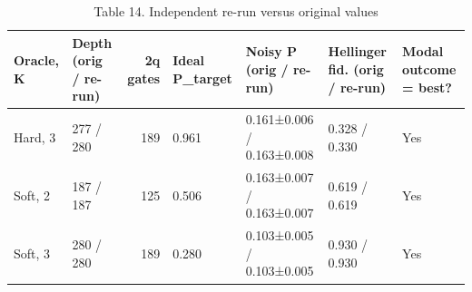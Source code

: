 \begin{table}
\caption{Table 14. Independent re-run versus original values}
\label{tab:table14}
\begin{tabular}{llrllll}
\toprule
Oracle, K & Depth (orig / re-run) & 2q gates & Ideal P\_target & Noisy P (orig / re-run) & Hellinger fid. (orig / re-run) & Modal outcome = best? \\
\midrule
Hard, 3 & 277 / 280 & 189 & 0.961 & 0.161±0.006 / 0.163±0.008 & 0.328 / 0.330 & Yes \\
Soft, 2 & 187 / 187 & 125 & 0.506 & 0.163±0.007 / 0.163±0.007 & 0.619 / 0.619 & Yes \\
Soft, 3 & 280 / 280 & 189 & 0.280 & 0.103±0.005 / 0.103±0.005 & 0.930 / 0.930 & Yes \\
\bottomrule
\end{tabular}
\end{table}
